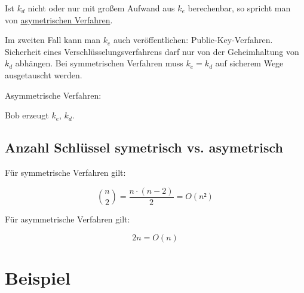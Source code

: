 Ist $k_d$ nicht oder nur mit großem Aufwand aus $k_e$ berechenbar, so spricht man von \underline{asymetrischen Verfahren}.

\par\medskip

Im zweiten Fall kann man $k_e$ auch veröffentlichen: Public-Key-Verfahren. Sicherheit eines Verschlüsselungsverfahrens darf nur von der Geheimhaltung von $k_d$ abhängen. Bei symmetrischen Verfahren muss $k_e = k_d$ auf sicherem Wege ausgetauscht werden.

\par\medskip

Asymmetrische Verfahren: 

Bob erzeugt $k_e$, $k_d$.

\subsection{Anzahl Schlüssel symetrisch vs. asymetrisch}
Für symmetrische Verfahren gilt:

\begin{equation}
  {n \choose 2 } = \frac{n \cdot (n-2)}{2} = O(n²) 
\end{equation}

Für asymmetrische Verfahren gilt:

\begin{equation}
  2n = O(n)
\end{equation}


\section{Beispiel}

